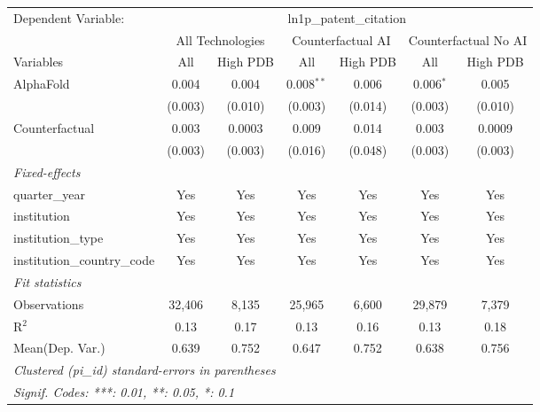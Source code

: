 \begingroup
\centering
\begin{tabular}{lcccccc}
   \tabularnewline \midrule \midrule
   Dependent Variable: & \multicolumn{6}{c}{ln1p\_patent\_citation}\\
 & \multicolumn{2}{c}{All Technologies} & \multicolumn{2}{c}{Counterfactual AI} & \multicolumn{2}{c}{Counterfactual No AI} \\
\cmidrule(lr){1-1}\cmidrule(lr){2-3} \cmidrule(lr){4-5} \cmidrule(lr){6-7}
Variables & \multicolumn{1}{c}{All} & \multicolumn{1}{c}{High PDB} & \multicolumn{1}{c}{All} & \multicolumn{1}{c}{High PDB} & \multicolumn{1}{c}{All} & \multicolumn{1}{c}{High PDB} \\
\cmidrule(lr){1-1}\cmidrule(lr){2-2} \cmidrule(lr){3-3} \cmidrule(lr){4-4} \cmidrule(lr){5-5} \cmidrule(lr){6-6} \cmidrule(lr){7-7}
   AlphaFold                    & 0.004   & 0.004   & 0.008$^{**}$ & 0.006   & 0.006$^{*}$ & 0.005\\   
                                & (0.003) & (0.010) & (0.003)      & (0.014) & (0.003)     & (0.010)\\   
   Counterfactual               & 0.003   & 0.0003  & 0.009        & 0.014   & 0.003       & 0.0009\\   
                                & (0.003) & (0.003) & (0.016)      & (0.048) & (0.003)     & (0.003)\\   
   \midrule
   \emph{Fixed-effects}\\
   quarter\_year                & Yes     & Yes     & Yes          & Yes     & Yes         & Yes\\  
   institution                  & Yes     & Yes     & Yes          & Yes     & Yes         & Yes\\  
   institution\_type            & Yes     & Yes     & Yes          & Yes     & Yes         & Yes\\  
   institution\_country\_code   & Yes     & Yes     & Yes          & Yes     & Yes         & Yes\\  
   \midrule
   \emph{Fit statistics}\\
   Observations                 & 32,406  & 8,135   & 25,965       & 6,600   & 29,879      & 7,379\\  
   R$^2$                        & 0.13    & 0.17    & 0.13         & 0.16    & 0.13        & 0.18\\  
Mean(Dep. Var.) & 0.639 & 0.752 & 0.647 & 0.752 & 0.638 & 0.756 \\
   \midrule \midrule
   \multicolumn{7}{l}{\emph{Clustered (pi\_id) standard-errors in parentheses}}\\
   \multicolumn{7}{l}{\emph{Signif. Codes: ***: 0.01, **: 0.05, *: 0.1}}\\
\end{tabular}
\par\endgroup
